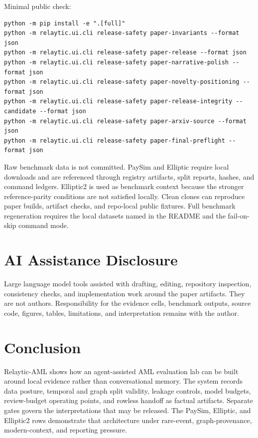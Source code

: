 \documentclass[11pt]{article}
\begin{document}
Minimal public check:

\begin{Verbatim}[frame=single,framesep=6pt,fontsize=\footnotesize,breaklines=true,breakanywhere=true]
python -m pip install -e ".[full]"
python -m relaytic.ui.cli release-safety paper-invariants --format json
python -m relaytic.ui.cli release-safety paper-release --format json
python -m relaytic.ui.cli release-safety paper-narrative-polish --format json
python -m relaytic.ui.cli release-safety paper-novelty-positioning --format json
python -m relaytic.ui.cli release-safety paper-release-integrity --candidate --format json
python -m relaytic.ui.cli release-safety paper-arxiv-source --format json
python -m relaytic.ui.cli release-safety paper-final-preflight --format json
\end{Verbatim}


Raw benchmark data is not committed. PaySim and Elliptic require local downloads and are referenced through registry artifacts, split reports, hashes, and command ledgers. Elliptic2 is used as benchmark context because the stronger reference-parity conditions are not satisfied locally. Clean clones can reproduce paper builds, artifact checks, and repo-local public fixtures. Full benchmark regeneration requires the local datasets named in the README and the fail-on-skip command mode.

\section{AI Assistance Disclosure}

Large language model tools assisted with drafting, editing, repository inspection, consistency checks, and implementation work around the paper artifacts. They are not authors. Responsibility for the evidence cells, benchmark outputs, source code, figures, tables, limitations, and interpretation remains with the author.

\section{Conclusion}

Relaytic-AML shows how an agent-assisted AML evaluation lab can be built around local evidence rather than conversational memory. The system records data posture, temporal and graph split validity, leakage controls, model budgets, review-budget operating points, and rowless handoff as factual artifacts. Separate gates govern the interpretations that may be released. The PaySim, Elliptic, and Elliptic2 rows demonstrate that architecture under rare-event, graph-provenance, modern-context, and reporting pressure.
\end{document}
